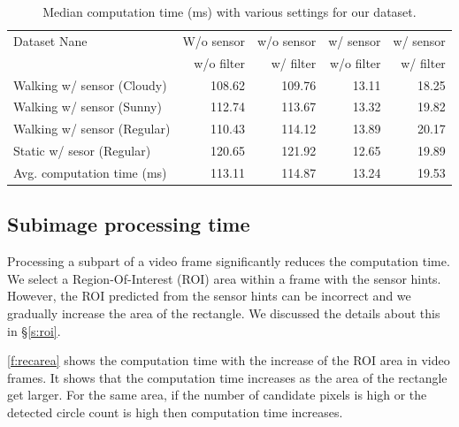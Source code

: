 \begin{table}[!ht]
  \centering
  \caption{Median computation time (ms) with various settings for our dataset.}
  \label{t:dataset_time}
  \begin{tabular}{  l r r r r}
    \rowcolor{gray!50}
    Dataset Nane & W/o sensor & w/o sensor & w/ sensor  & w/ sensor \\
    \rowcolor{gray!50}
    & w/o filter & w/ filter & w/o filter & w/ filter\\
    \hline
    Walking w/ sensor (Cloudy) & 108.62 & 109.76 & 13.11 & 18.25 \\
    Walking w/ sensor (Sunny) & 112.74 & 113.67 & 13.32 & 19.82 \\
    Walking w/ sensor (Regular) & 110.43 & 114.12 & 13.89 & 20.17 \\
    Static w/ sesor (Regular) & 120.65 & 121.92 & 12.65 & 19.89\\
    \hline
    Avg. computation time (ms) & 113.11 & 114.87 & 13.24 & 19.53\\
    
  \end{tabular}
\end{table}

\subsection{Subimage processing time}
Processing a subpart of a video frame significantly reduces the computation time. 
We select a Region-Of-Interest (ROI) area within a frame with the sensor hints.
However, the ROI predicted from the sensor hints can be incorrect and we gradually increase the area of the rectangle.
We discussed the details about this in \S\ref{s:roi}.


\ref{f:recarea} shows the computation time with the increase of the ROI area in video frames.
It shows that the computation time increases as the area of the rectangle get larger.
For the same area, if the number of candidate pixels is high or the detected circle count is high then computation time increases.

